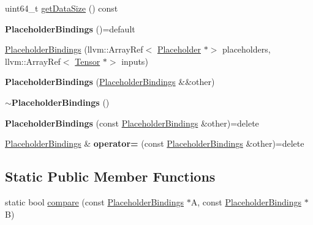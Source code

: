 \begin{Indent}
\begin{DoxyCompactItemize}
\item 
uint64\+\_\+t \hyperlink{classglow_1_1_placeholder_bindings_a685ce6158dca1118a743fb60ec9c7182}{get\+Data\+Size} () const
\item 
\mbox{\label{classglow_1_1_placeholder_bindings_a53f875de6aa4fe8768d9027d60152bc5}} 
{\bfseries Placeholder\+Bindings} ()=default
\item 
\hyperlink{classglow_1_1_placeholder_bindings_a9d3fc7d15e95e583d24f8b1a66aff54f}{Placeholder\+Bindings} (llvm\+::\+Array\+Ref$<$ \hyperlink{classglow_1_1_placeholder}{Placeholder} $\ast$$>$ placeholders, llvm\+::\+Array\+Ref$<$ \hyperlink{classglow_1_1_tensor}{Tensor} $\ast$$>$ inputs)
\item 
\mbox{\label{classglow_1_1_placeholder_bindings_ad5484de3efb4567a0cf870ad67166ee7}} 
{\bfseries Placeholder\+Bindings} (\hyperlink{classglow_1_1_placeholder_bindings}{Placeholder\+Bindings} \&\&other)
\item 
\mbox{\label{classglow_1_1_placeholder_bindings_af9557fbb520f13a81ea7b99e1829dde3}} 
{\bfseries $\sim$\+Placeholder\+Bindings} ()
\item 
\mbox{\label{classglow_1_1_placeholder_bindings_a3ebd8843f7adf5692cbcc94b14514af8}} 
{\bfseries Placeholder\+Bindings} (const \hyperlink{classglow_1_1_placeholder_bindings}{Placeholder\+Bindings} \&other)=delete
\item 
\mbox{\label{classglow_1_1_placeholder_bindings_afa82636e9da2c416007f27e653443752}} 
\hyperlink{classglow_1_1_placeholder_bindings}{Placeholder\+Bindings} \& {\bfseries operator=} (const \hyperlink{classglow_1_1_placeholder_bindings}{Placeholder\+Bindings} \&other)=delete
\end{DoxyCompactItemize}
\end{Indent}
\subsection*{Static Public Member Functions}
\begin{DoxyCompactItemize}
\item 
static bool \hyperlink{classglow_1_1_placeholder_bindings_a003d57e22107d779b7de70cd53336c19}{compare} (const \hyperlink{classglow_1_1_placeholder_bindings}{Placeholder\+Bindings} $\ast$A, const \hyperlink{classglow_1_1_placeholder_bindings}{Placeholder\+Bindings} $\ast$B)
\end{DoxyCompactItemize}


